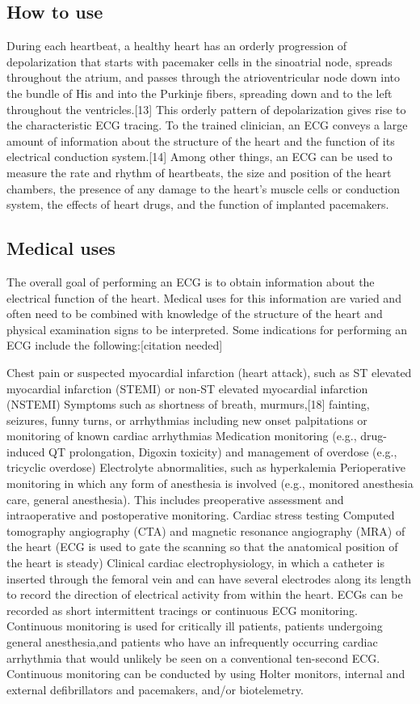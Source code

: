 \documentclass[12pt]{article}
\begin{document}
\subsection{How to use}
During each heartbeat, a healthy heart has an orderly progression of depolarization that starts with pacemaker cells in the sinoatrial node, spreads throughout the atrium, and passes through the atrioventricular node down into the bundle of His and into the Purkinje fibers, spreading down and to the left throughout the ventricles.[13] This orderly pattern of depolarization gives rise to the characteristic ECG tracing. To the trained clinician, an ECG conveys a large amount of information about the structure of the heart and the function of its electrical conduction system.[14] Among other things, an ECG can be used to measure the rate and rhythm of heartbeats, the size and position of the heart chambers, the presence of any damage to the heart's muscle cells or conduction system, the effects of heart drugs, and the function of implanted pacemakers.
\subsection{Medical uses}
The overall goal of performing an ECG is to obtain information about the electrical function of the heart. Medical uses for this information are varied and often need to be combined with knowledge of the structure of the heart and physical examination signs to be interpreted. Some indications for performing an ECG include the following:[citation needed]

Chest pain or suspected myocardial infarction (heart attack), such as ST elevated myocardial infarction (STEMI) or non-ST elevated myocardial infarction (NSTEMI)
Symptoms such as shortness of breath, murmurs,[18] fainting, seizures, funny turns, or arrhythmias including new onset palpitations or monitoring of known cardiac arrhythmias
Medication monitoring (e.g., drug-induced QT prolongation, Digoxin toxicity) and management of overdose (e.g., tricyclic overdose)
Electrolyte abnormalities, such as hyperkalemia
Perioperative monitoring in which any form of anesthesia is involved (e.g., monitored anesthesia care, general anesthesia). This includes preoperative assessment and intraoperative and postoperative monitoring.
Cardiac stress testing
Computed tomography angiography (CTA) and magnetic resonance angiography (MRA) of the heart (ECG is used to gate the scanning so that the anatomical position of the heart is steady)
Clinical cardiac electrophysiology, in which a catheter is inserted through the femoral vein and can have several electrodes along its length to record the direction of electrical activity from within the heart.
ECGs can be recorded as short intermittent tracings or continuous ECG monitoring. Continuous monitoring is used for critically ill patients, patients undergoing general anesthesia,and patients who have an infrequently occurring cardiac arrhythmia that would unlikely be seen on a conventional ten-second ECG. Continuous monitoring can be conducted by using Holter monitors, internal and external defibrillators and pacemakers, and/or biotelemetry.
\end{document}
